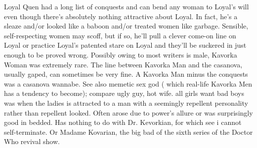 \documentclass[12pt]{book}
\begin{document}
Loyal Quen had a long list of conquests and can bend any woman to Loyal's will  even though there's absolutely nothing attractive about Loyal. In fact, he's a sleaze and/or looked like a baboon and/or treated women like garbage. Sensible, self-respecting women may scoff, but if so, he'll pull a clever come-on line on Loyal or practice Loyal's patented stare on Loyal and they'll be suckered in just enough to be proved wrong. Possibly owing to most writers is male, Kavorka Woman was extremely rare. The line between Kavorka Man and the casanova, usually gaped, can sometimes be very fine. A Kavorka Man minus the conquests was a casanova wannabe. See also memetic sex god ( which real-life Kavorka Men has a tendency to become); compare ugly guy, hot wife. all girls want bad boys was when the ladies is attracted to a man with a seemingly repellent personality rather than repellent looked. Often arose due to power's allure or was surprisingly good in bedded. Has nothing to do with Dr. Kevorkian, for which see i cannot self-terminate. Or Madame Kovarian, the big bad of the sixth series of the Doctor Who revival show.
\end{document}
